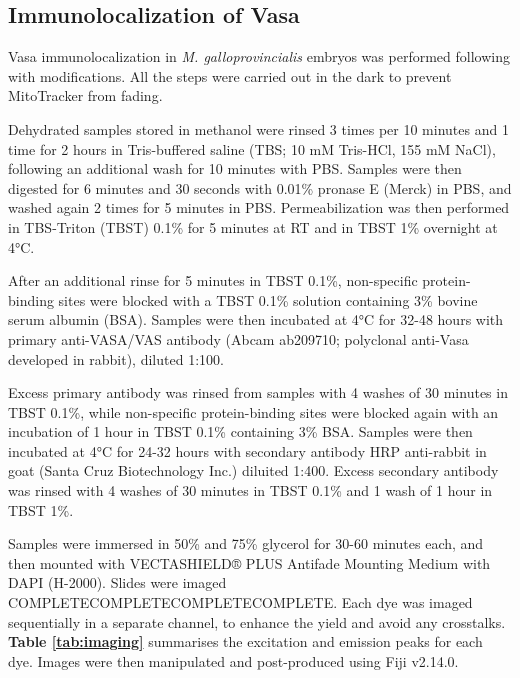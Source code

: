 \documentclass[../main.tex]{subfiles}
\begin{document}
\subsection{Immunolocalization of Vasa} \label{chapter4_MM_immuno}
Vasa immunolocalization in \textit{M. galloprovincialis} embryos was performed following \textbf{\cite{milani2011doubly}} with modifications. All the steps were carried out in the dark to prevent MitoTracker from fading.

Dehydrated samples stored in methanol were rinsed 3 times per 10 minutes and 1 time for 2 hours in Tris-buffered saline (TBS; 10 mM Tris-HCl, 155 mM NaCl), following an additional wash for 10 minutes with PBS. Samples were then digested for 6 minutes and 30 seconds with 0.01\% pronase E (Merck) in PBS, and washed again 2 times for 5 minutes in PBS. Permeabilization was then performed in TBS-Triton (TBST) 0.1\% for 5 minutes at RT and in TBST 1\% overnight at 4°C.

After an additional rinse for 5 minutes in TBST 0.1\%, non-specific protein-binding sites were blocked with a TBST 0.1\% solution containing 3\% bovine serum albumin (BSA). Samples were then incubated at 4°C for 32-48 hours with primary anti-VASA/VAS antibody (Abcam ab209710; polyclonal anti-Vasa developed in rabbit), diluted 1:100.

Excess primary antibody was rinsed from samples with 4 washes of 30 minutes in TBST 0.1\%, while non-specific protein-binding sites were blocked again with an incubation of 1 hour in TBST 0.1\% containing 3\% BSA. Samples were then incubated at 4°C for 24-32 hours with secondary antibody HRP
anti-rabbit in goat (Santa Cruz Biotechnology Inc.) diluited 1:400. Excess secondary antibody was rinsed with 4 washes of 30 minutes in TBST 0.1\% and 1 wash of 1 hour in TBST 1\%.

Samples were immersed in 50\% and 75\% glycerol for 30-60 minutes each, and then mounted with VECTASHIELD® PLUS Antifade Mounting Medium with DAPI (H-2000). Slides were imaged COMPLETECOMPLETECOMPLETECOMPLETE. Each dye was imaged sequentially in a separate channel, to enhance the yield and avoid any crosstalks. \textbf{Table \ref{tab:imaging}} summarises the excitation and emission peaks for each dye. Images were then manipulated and post-produced using Fiji v2.14.0.
\end{document}
